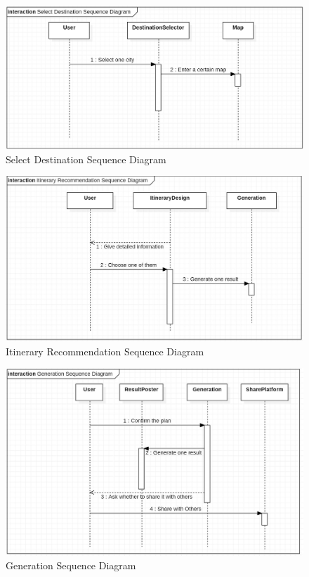 \documentclass[10pt]{article}
\begin{document}
\begin{figure}[H]
    \centering
    
    \includegraphics[width=14cm]{destination.jpg}
    \caption{Select Destination Sequence Diagram}
    \label{Select Destination Sequence Diagram}
\end{figure}

\begin{figure}[H]
    \centering
    
    \includegraphics[width=14cm]{itinerary.jpg}
    \caption{Itinerary Recommendation Sequence Diagram}
    \label{Itinerary Recommendation Sequence Diagram}
\end{figure}

\begin{figure}[H]
    \centering
    
    \includegraphics[width=14cm]{generation.jpg}
    \caption{Generation Sequence Diagram}
    \label{Generation Sequence Diagram}
\end{figure}
\end{document}
